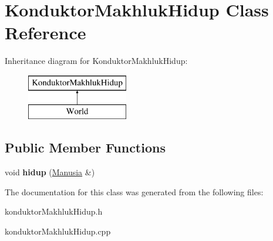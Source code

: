 \hypertarget{class_konduktor_makhluk_hidup}{}\section{Konduktor\+Makhluk\+Hidup Class Reference}
\label{class_konduktor_makhluk_hidup}
Inheritance diagram for Konduktor\+Makhluk\+Hidup\+:\begin{figure}[H]
\begin{center}
\leavevmode
\includegraphics[height=2.000000cm]{class_konduktor_makhluk_hidup}
\end{center}
\end{figure}
\subsection*{Public Member Functions}
\begin{DoxyCompactItemize}
\item 
void {\bfseries hidup} (\hyperlink{class_manusia}{Manusia} \&)\hypertarget{class_konduktor_makhluk_hidup_a87e20c1fac7f69730e1f800928fdab59}{}\label{class_konduktor_makhluk_hidup_a87e20c1fac7f69730e1f800928fdab59}

\end{DoxyCompactItemize}


The documentation for this class was generated from the following files\+:\begin{DoxyCompactItemize}
\item 
konduktor\+Makhluk\+Hidup.\+h\item 
konduktor\+Makhluk\+Hidup.\+cpp\end{DoxyCompactItemize}
